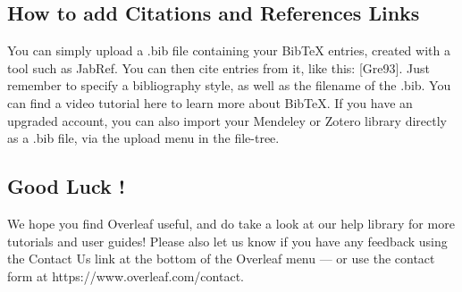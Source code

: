 \documentclass{article}
\begin{document}
\subsection{How to add Citations and References Links }

You can simply upload a .bib file containing your BibTeX entries, created with a tool such as JabRef.
You can then cite entries from it, like this: [Gre93]. Just remember to specify a bibliography style, as
well as the filename of the .bib. You can find a video tutorial here to learn more about BibTeX.
If you have an upgraded account, you can also import your Mendeley or Zotero library directly as
a .bib file, via the upload menu in the file-tree.

\subsection{Good Luck !}
We hope you find Overleaf useful, and do take a look at our help library for more tutorials and user
guides! Please also let us know if you have any feedback using the Contact Us link at the bottom of
the Overleaf menu — or use the contact form at https://www.overleaf.com/contact.
	
\end{document}
